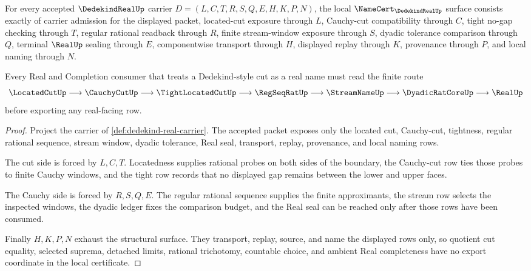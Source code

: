 \begin{theorem}
\label{thm:dedekind-real-namecert-obligations}
For every accepted $\DedekindRealUp$ carrier $D=(L,C,T,R,S,Q,E,H,K,P,N)$, the local $\NameCert_{\DedekindRealUp}$ surface consists exactly of carrier admission for the displayed packet, located-cut exposure through $L$, Cauchy-cut compatibility through $C$, tight no-gap checking through $T$, regular rational readback through $R$, finite stream-window exposure through $S$, dyadic tolerance comparison through $Q$, terminal $\RealUp$ sealing through $E$, componentwise transport through $H$, displayed replay through $K$, provenance through $P$, and local naming through $N$.

Every Real and Completion consumer that treats a Dedekind-style cut as a real name must read the finite route
$$
\LocatedCutUp \longrightarrow \CauchyCutUp \longrightarrow \TightLocatedCutUp \longrightarrow \RegSeqRatUp \longrightarrow \StreamNameUp \longrightarrow \DyadicRatCoreUp \longrightarrow \RealUp
$$
before exporting any real-facing row.
\end{theorem}
\begin{proof}
Project the carrier of \autoref{def:dedekind-real-carrier}. The accepted packet exposes only the located cut, Cauchy-cut, tightness, regular rational sequence, stream window, dyadic tolerance, Real seal, transport, replay, provenance, and local naming rows.

The cut side is forced by $L,C,T$. Locatedness supplies rational probes on both sides of the boundary, the Cauchy-cut row ties those probes to finite Cauchy windows, and the tight row records that no displayed gap remains between the lower and upper faces.

The Cauchy side is forced by $R,S,Q,E$. The regular rational sequence supplies the finite approximants, the stream row selects the inspected windows, the dyadic ledger fixes the comparison budget, and the Real seal can be reached only after those rows have been consumed.

Finally $H,K,P,N$ exhaust the structural surface. They transport, replay, source, and name the displayed rows only, so quotient cut equality, selected suprema, detached limits, rational trichotomy, countable choice, and ambient Real completeness have no export coordinate in the local certificate.
\end{proof}

